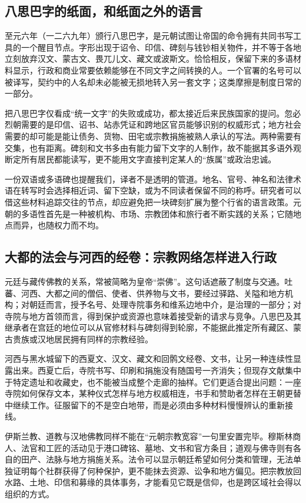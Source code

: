 \subsection{八思巴字的纸面，和纸面之外的语言}

至元六年（一二六九年）颁行八思巴字，是元朝试图让帝国的命令拥有共同书写工具的一个醒目节点。字形出现于诏令、印信、碑刻与钱钞相关物件，并不等于各地立刻放弃汉文、蒙古文、畏兀儿文、藏文或波斯文。恰恰相反，保留下来的多语材料显示，行政和商业常要依赖能够在不同文字之间转换的人。一个官署的名号可以被译写，契约中的人名却未必能被无损地转入另一套文字；这类摩擦是制度日常的一部分。

把八思巴字仅看成“统一文字”的失败或成功，都太接近后来民族国家的提问。忽必烈朝需要的是印信、诏书、站赤凭证和跨地区官员能够识别的权威形式；地方社会需要的却可能是能让债务、货物、田宅或宗教捐施被熟人承认的写法。两种需要有交集，也有距离。碑刻和文书多由有能力留下文字的人制作，故不能据其多语外观断定所有居民都能读写，更不能用文字直接判定某人的“族属”或政治忠诚。

一份双语或多语碑也提醒我们，译者不是透明的管道。地名、官号、神名和法律术语在转写时会选择相近词、留下空缺，或为不同读者保留不同的称呼。研究者可以借这些材料追踪交往的节点，却应避免把一块碑刻扩展为整个行省的语言政策。元朝的多语性首先是一种被机构、市场、宗教团体和旅行者不断实践的关系；它随地点而异，也随权力而不均。

\subsection{大都的法会与河西的经卷：宗教网络怎样进入行政}

元廷与藏传佛教的关系，常被简略为皇帝“崇佛”。这句话遮蔽了制度与交通。吐蕃、河西、大都之间的僧侣、使者、供养物与文书，要经过驿路、关隘和地方机构；对朝廷而言，授予名号、处理寺院事务和维系边地中介，是治理的一部分；对寺院与地方首领而言，得到保护或资源也意味着接受新的请求与竞争。八思巴及其继承者在宫廷的地位可以从官修材料与碑刻得到轮廓，不能据此推定所有藏区、蒙古贵族或汉地居民拥有同样的宗教经验。

河西与黑水城留下的西夏文、汉文、藏文和回鹘文经卷、文书，让另一种连续性显露出来。西夏亡后，寺院书写、印刷和捐施没有随国号一齐消失；但现存文献集中于特定遗址和收藏史，也不能被当成整个走廊的抽样。它们更适合提出问题：一座寺院如何保存文本，某种仪式怎样与地方权威相连，书手和赞助者怎样在王朝更替中继续工作。征服留下的不是空白地带，而是必须由多种材料慢慢辨认的重新接线。

伊斯兰教、道教与汉地佛教同样不能在“元朝宗教宽容”一句里安置完毕。穆斯林商人、法官和工匠的活动见于港口碑铭、墓地、文书和官方条目；道观与佛寺则有各自的田产、法脉与地方捐施关系。法令可以显示朝廷希望如何分类和管理，无法单独证明每个社群获得了何种保护，更不能抹去资源、讼争和地方偏见。把宗教放回水路、土地、印信和募缘的具体事务，才能看见它既是信仰，也是跨区域社会得以组织的方式。

